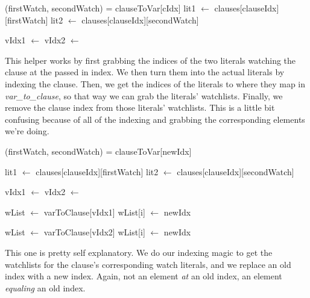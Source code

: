 \begin{algorithm}[H]
\caption{Remove Clause From WatchList}\label{alg:43}
\begin{algorithmic}[1]
    \State (firstWatch, secondWatch) = clauseToVar[cIdx]
    \State lit1 $\gets$ clauses[clauseIdx][firstWatch]
    \State lit2 $\gets$ clauses[clauseIdx][secondWatch]

    \State vIdx1 $\gets$ 
    \State vIdx2 $\gets$ 

    \State {}
        \State {}
    \EndIf
\EndFor

\EndProcedure
\end{algorithmic}
\end{algorithm}
\noindent
This helper works by first grabbing the indices of the two literals watching 
the clause at the passed in index. We then turn them into the actual literals 
by indexing the clause. Then, we get the indices of the literals to where they 
map in \textit{var\_to\_clause}, so that way we can grab the literals' watchlists.
Finally, we remove the clause index from those literals' watchlists. This is a 
little bit confusing because of all of the indexing and grabbing the corresponding 
elements we're doing. 

\begin{algorithm}[H]
\caption{Remove Watch Index}\label{alg:44}
\begin{algorithmic}[1]
    \State (firstWatch, secondWatch) = clauseToVar[newIdx]

    \State lit1 $\gets$ clauses[clauseIdx][firstWatch]
    \State lit2 $\gets$ clauses[clauseIdx][secondWatch]

    \State vIdx1 $\gets$ 
    \State vIdx2 $\gets$ 

    \State wList $\gets$ varToClause[vIdx1]
            \State wList[i] $\gets$ newIdx
        \EndIf
    \EndFor

        \State wList $\gets$ varToClause[vIdx2]
                \State wList[i] $\gets$ newIdx
            \EndIf
        \EndFor
    \EndIf

\EndProcedure
\end{algorithmic}
\end{algorithm}
\noindent
This one is pretty self explanatory. We do our indexing magic to get the watchlists 
for the clause's corresponding watch literals, and we replace an old index with 
a new index. Again, not an element \textit{at} an old index, an element \textit{equaling}
an old index.

